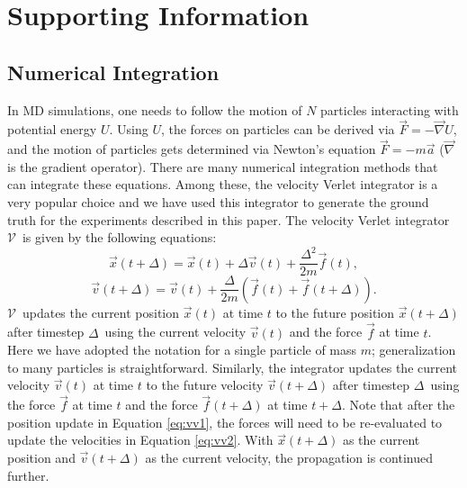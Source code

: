 \documentclass[aps,prl,twocolumn,superscriptaddress,tightenlines,longbibliography, reprint]{revtex4-1}
\newcommand{\dt}{$\Delta$}
\newcommand{\V}{$\mathscr{V}$}
\begin{document}
\section{Supporting Information}\label{integrators}

\subsection{Numerical Integration}
In MD simulations, one needs to follow the motion of $N$ particles interacting with potential energy $U$. Using $U$, the forces on particles can be derived via $\vec{F} = - \vec{\nabla}U$, and the motion of particles gets determined via Newton's equation $\vec{F} = - m\vec{a}$ ($\vec{\nabla}$ is the gradient operator). There are many numerical integration methods that can integrate these equations. Among these, the velocity Verlet integrator is a very popular choice and we have used this integrator to generate the ground truth for the experiments described in this paper. The velocity Verlet integrator \V\ is given by the following equations:
\begin{equation} \label{eq:vv1}
    \vec{x}(t + \Delta) = \vec{x}(t) + \Delta \vec{v}(t) +
\frac{\Delta^2}{2m} \vec{f}(t),
\end{equation}
\begin{equation} \label{eq:vv2}
    \vec{v}(t + \Delta) = \vec{v}(t) + \frac{\Delta}{2m} \left(\vec{f}(t)+\vec{f}(t+\Delta )\right).
\end{equation}
\V\ updates the current position $\vec{x}(t)$ at time $t$  to the future position $\vec{x}(t + \Delta)$ after timestep \dt\ using the current velocity $\vec{v}(t)$ and the force $\vec{f}$ at time $t$. Here we have adopted the notation for a single particle of mass $m$; generalization to many particles is straightforward. Similarly, the integrator updates the current velocity $\vec{v}(t)$ at time $t$  to the future velocity $\vec{v}(t + \Delta)$ after timestep \dt\ using the force $\vec{f}$ at time $t$ and the force $\vec{f} (t+ \Delta)$ at time $t+\Delta$. Note that after the position update in Equation \ref{eq:vv1}, the forces will need to be re-evaluated to update the velocities in Equation \ref{eq:vv2}. With $\vec{x}(t +\Delta)$ as the current position and $\vec{v}(t +\Delta)$ as the current velocity, the propagation is continued further. 
\end{document}
